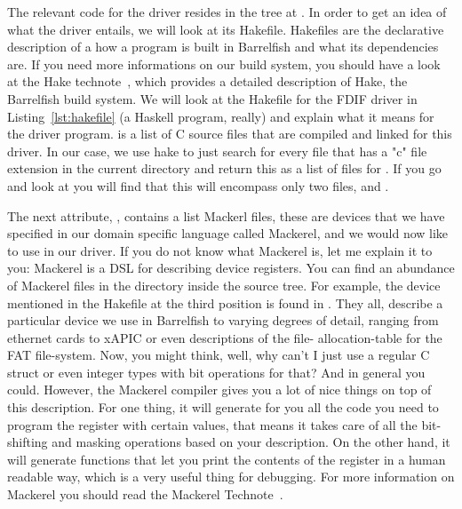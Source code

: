 \documentclass[a4paper,11pt,twoside]{report}
\begin{document}
The relevant code for the driver resides in the tree at
. In order to get an idea of what the
driver entails, we will look at its Hakefile. Hakefiles are the declarative
description of a how a program is built in Barrelfish and what its
dependencies are. If you need more informations on our build system, you
should have a look at the Hake technote~\cite{btn003-hake}, which provides a
detailed description of Hake, the Barrelfish build system. We will look at the
Hakefile for the FDIF driver in Listing~\ref{lst:hakefile} (a Haskell program,
really) and explain what it means for the driver program.  is
a list of C source files that are compiled and linked for this driver. In our
case, we use hake to just search for every file that has a "c" file extension
in the current directory and return this as a list of files for
. If you go and look at 
you will find that this will encompass only two files,  and
.

The next attribute, , contains a list Mackerl files,
these are devices that we have specified in our domain specific language
called Mackerel, and we would now like to use in our driver. If you do not
know what Mackerel is, let me explain it to you: Mackerel is a DSL for
describing device registers. You can find an abundance of Mackerel files in
the  directory inside the source tree. For example, the
 device mentioned in the Hakefile at the third
position is found in . They all,
describe a particular device we use in Barrelfish to varying degrees of
detail, ranging from ethernet cards to xAPIC or even descriptions of the file-
allocation-table for the FAT file-system. Now, you might think, well, why
can't I just use a regular C struct or even integer types with bit operations
for that? And in general you could. However, the Mackerel compiler gives you a
lot of nice things on top of this description. For one thing, it will generate
for you all the code you need to program the register with certain values,
that means it takes care of all the bit-shifting and masking operations based
on your description. On the other hand, it will generate functions that let
you print the contents of the register in a human readable way, which is a
very useful thing for debugging. For more information on Mackerel you should
read the Mackerel Technote~\cite{btn002-mackerel}.
\end{document}
